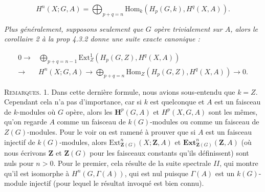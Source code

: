 \[
\tag{4.4.2}
H^n(X;G,A)=
\bigoplus_{p+q=n}
\mathrm{Hom}_k(H_p(G,k),H^q(X,A)).
\]

\textit{Plus généralement, supposons seulement que $G$ opère trivialement sur
$A$, alors le corollaire \textup{2} à la prop \textup{4.3.2} donne une suite exacte canonique :}

\[
\tag{4.4.3}
\begin{aligned}
0\to{}&
\bigoplus_{p+q=n-1}
\mathrm{Ext}_{Z}^1(H_p(G,Z),H^q(X,A))\\
\to{}&H^n(X;G,A)
\to
\bigoplus_{p+q=n}
\mathrm{Hom}_{Z}(H_p(G,Z),H^q(X,A))
\to0.
\end{aligned}
\]

\textsc{Remarques.} 1. Dans cette dernière formule, nous avions
sous-entendu que $k=Z$. Cependant cela n'a pas d'importance, car si
$k$ est quelconque et $A$ est un faisceau de $k$-modules où $G$ opère, alors
les $\mathbf H^p(G,A)$ et $H^p(X,G,A)$ sont les mêmes, qu'on regarde $A$ comme un
faisceau de $k(G)$-modules ou comme un faisceau de $Z(G)$-modules.
Pour le voir on est ramené à prouver que si $A$ est un faisceau injectif de
$k(G)$-modules, alors
$\mathrm{Ext}_{\mathbf Z(G)}^n(X;\mathbf Z,A)$ et
$\mathbf{Ext}_{\mathbf Z(G)}^n(\mathbf Z,A)$ (où nous écrivons $\mathbf Z$ et
$\mathbf Z(G)$ pour les faisceaux constants qu'ils définissent) sont nuls pour
$n>0$. Pour le premier, cela résulte de la suite spectrale $II$, qui montre
qu'il est isomorphe à $H^n(G,\Gamma(A))$, qui est nul puisque $\Gamma(A)$ est
un $k(G)$-module injectif (pour lequel le résultat invoqué est bien connu).

